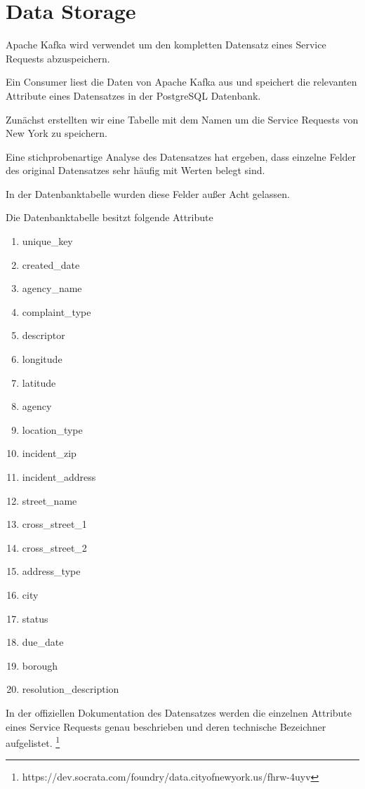 \section{Data Storage}
Apache Kafka wird verwendet um den kompletten Datensatz eines Service Requests abzuspeichern.

Ein Consumer liest die Daten von Apache Kafka aus und speichert die relevanten Attribute eines Datensatzes in der PostgreSQL Datenbank.

Zunächst erstellten wir eine Tabelle mit dem Namen  um die Service Requests von New York zu speichern.

Eine stichprobenartige Analyse des Datensatzes hat ergeben, dass einzelne Felder des original Datensatzes sehr häufig mit 
Werten belegt sind.

In der Datenbanktabelle  wurden diese Felder außer Acht gelassen.

Die Datenbanktabelle besitzt folgende Attribute
\begin{enumerate}
  \item unique\_key
  \item created\_date
  \item agency\_name
  \item complaint\_type
  \item descriptor
  \item longitude
  \item latitude
  \item agency
  \item location\_type
  \item incident\_zip
  \item incident\_address
  \item street\_name
  \item cross\_street\_1
  \item cross\_street\_2
  \item address\_type
  \item city
  \item status
  \item due\_date
  \item borough
  \item resolution\_description
\end{enumerate}

In der offiziellen Dokumentation des Datensatzes werden die einzelnen Attribute
eines Service Requests genau beschrieben und deren technische Bezeichner aufgelistet.
\footnote{https://dev.socrata.com/foundry/data.cityofnewyork.us/fhrw-4uyv}

